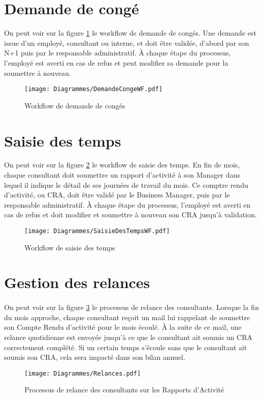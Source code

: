 \section{Demande de congé}
On peut voir sur la figure \ref{conges} le workflow de demande de congés. Une demande est issue d'un employé, consultant ou interne, et doit être validée, d'abord par son N+1 puis par le responsable administratif. À chaque étape du processus, l'employé est averti en cas de refus et peut modifier sa demande pour la soumettre à nouveau.
\begin{figure}
	\texttt{[image: Diagrammes/DemandeCongeWF.pdf]}
	\caption{Workflow de demande de congés}
	\label{conges}
\end{figure}

\section{Saisie des temps}

On peut voir sur la figure \ref{tps} le workflow de saisie des temps. En fin de mois, chaque consultant doit soumettre un rapport d'activité à son Manager dans lequel il indique le détail de ses journées de travail du mois. Ce comptre rendu d'activité, ou CRA, doit être validé par le Business Manager, puis par le responsable administratif. À chaque étape du processus, l'employé est averti en cas de refus et doit modifier et soumettre à nouveau son CRA jusqu'à validation.
\begin{figure}
	\texttt{[image: Diagrammes/SaisieDesTempsWF.pdf]}
	\caption{Workflow de saisie des temps}
	\label{tps}
\end{figure}


\section{Gestion des relances}
\paragraph{} On peut voir sur la figure \ref{relances} le processus de relance des consultants. Lorsque la fin du mois approche, chaque consultant reçoit un mail lui rappelant de soumettre son Compte Rendu d'activité pour le mois écoulé. À la suite de ce mail, une relance quotidienne est envoyée jusqu'à ce que le consultant ait soumis un CRA correctement complété. Si un certain temps s'écoule sans que le consultant ait soumis son CRA, cela sera impacté dans son bilan annuel.
\begin{figure}
	\texttt{[image: Diagrammes/Relances.pdf]}
	\caption{Processus de relance des consultants sur les Rapports d'Activité}
	\label{relances}
\end{figure}



